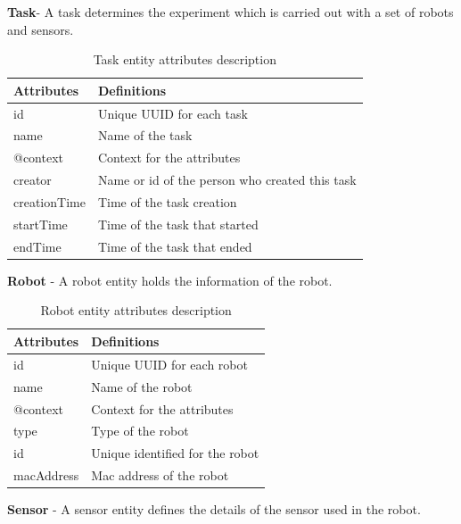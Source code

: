 	\textbf{Task}- A task determines the experiment which is carried out with a set of robots and sensors. 
	
	\begin{table}[h!]
		\begin{tabular}{|l|p{8cm}|}
			\hline
			\textbf{Attributes} & \textbf{Definitions} \\ \hline
			id & Unique UUID for each task \\ \hline
			name &  Name of the task \\ \hline
			@context &  Context for the attributes\\ \hline
			creator &  Name or id of the person who created this task\\ \hline
			creationTime &  Time of the task creation\\ \hline
			startTime & Time of the task that started\\ \hline
			endTime &  Time of the task that ended\\ \hline
			
		\end{tabular}
		\caption{Task entity attributes description}
		\label{tab:task_entity}
	\end{table}

	\textbf{Robot} - A robot entity holds the information of the robot.
	
	\begin{table}[h!]
		\begin{tabular}{|l|p{8cm}|}
			\hline
			\textbf{Attributes} & \textbf{Definitions} \\ \hline
			id & Unique UUID for each robot \\ \hline
			name & Name of the robot \\ \hline
			@context & Context for the attributes \\ \hline
			type & Type of the robot \\ \hline
			id & Unique identified for the robot \\ \hline
			macAddress & Mac address of the robot \\ \hline
			
		\end{tabular}
		\caption{Robot entity attributes description}
		\label{tab:robot_entity}
	\end{table}

	\textbf{Sensor} - A sensor entity defines the details of the sensor used in the robot.

